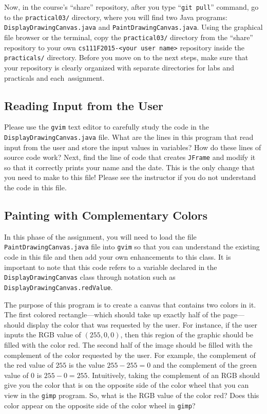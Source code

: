 Now, in the course's ``share'' repository, after you type ``{\tt git pull}'' command, go to the {\tt practical03/}
directory, where you will find two Java programs: {\tt DisplayDrawingCanvas.java} and {\tt PaintDrawingCanvas.java}.
Using the graphical file browser or the terminal, copy the {\tt practical03/} directory from the ``share''
repository to your own {\tt cs111F2015-<your user name>} repository inside the {\tt practicals/} directory. Before you
move on to the next steps, make sure that your repository is clearly organized with separate directories for labs and
practicals and \mbox{each assignment}.

\vspace*{-.1in}
\subsection*{Reading Input from the User}

Please use the {\tt gvim} text editor to carefully study the code in the {\tt DisplayDrawingCanvas.java} file. What are
the lines in this program that read input from the user and store the input values in variables? How do these lines of
source code work? Next, find the line of code that creates {\tt JFrame} and modify it so that it correctly prints your
name and the date. This is the only change that you need to make to this file! Please see the instructor if you do not
understand the code in this file.

\vspace*{-.1in}
\subsection*{Painting with Complementary Colors}

In this phase of the assignment, you will need to load the file {\tt PaintDrawingCanvas.java} file into {\tt gvim} so
that you can understand the existing code in this file and then add your own enhancements to this class. It is important
to note that this code refers to a variable declared in the {\tt DisplayDrawingCanvas} class through notation such as
{\tt DisplayDrawingCanvas.redValue}.

The purpose of this program is to create a canvas that contains two colors in it. The first colored rectangle---which
should take up exactly half of the page---should display the color that was requested by the user. For instance, if the
user inputs the RGB value of $(255,0,0)$, then this region of the graphic should be filled with the color red. The
second half of the image should be filled with the complement of the color requested by the user. For example, the
complement of the red value of $255$ is the value $255-255=0$ and the complement of the green value of $0$ is
$255-0=255$. Intuitively, taking the complement of an RGB should give you the color that is on the opposite side of the
color wheel that you can view in the {\tt gimp} program. So, what is the RGB value of the color red? Does this color
appear on the opposite side of the color wheel in {\tt gimp}?

